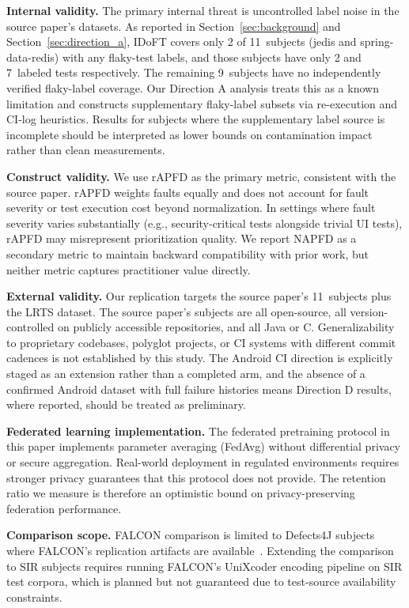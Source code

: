 \documentclass[10pt,conference]{IEEEtran}
\begin{document}
\textbf{Internal validity.} The primary internal threat is uncontrolled label noise in the source paper's datasets. As reported in Section~\ref{sec:background} and Section~\ref{sec:direction_a}, IDoFT covers only 2 of 11~subjects (jedis and spring-data-redis) with any flaky-test labels, and those subjects have only 2 and 7~labeled tests respectively. The remaining 9~subjects have no independently verified flaky-label coverage. Our Direction A analysis treats this as a known limitation and constructs supplementary flaky-label subsets via re-execution and CI-log heuristics. Results for subjects where the supplementary label source is incomplete should be interpreted as lower bounds on contamination impact rather than clean measurements.

\textbf{Construct validity.} We use rAPFD as the primary metric, consistent with the source paper. rAPFD weights faults equally and does not account for fault severity or test execution cost beyond normalization. In settings where fault severity varies substantially (e.g., security-critical tests alongside trivial UI tests), rAPFD may misrepresent prioritization quality. We report NAPFD as a secondary metric to maintain backward compatibility with prior work, but neither metric captures practitioner value directly.

\textbf{External validity.} Our replication targets the source paper's 11~subjects plus the LRTS dataset. The source paper's subjects are all open-source, all version-controlled on publicly accessible repositories, and all Java or C. Generalizability to proprietary codebases, polyglot projects, or CI systems with different commit cadences is not established by this study. The Android CI direction is explicitly staged as an extension rather than a completed arm, and the absence of a confirmed Android dataset with full failure histories means Direction D results, where reported, should be treated as preliminary.

\textbf{Federated learning implementation.} The federated pretraining protocol in this paper implements parameter averaging (FedAvg) without differential privacy or secure aggregation. Real-world deployment in regulated environments requires stronger privacy guarantees that this protocol does not provide. The retention ratio we measure is therefore an optimistic bound on privacy-preserving federation performance.

\textbf{Comparison scope.} FALCON comparison is limited to Defects4J subjects where FALCON's replication artifacts are available~\cite{falcon}. Extending the comparison to SIR subjects requires running FALCON's UniXcoder encoding pipeline on SIR test corpora, which is planned but not guaranteed due to test-source availability constraints.
\end{document}
